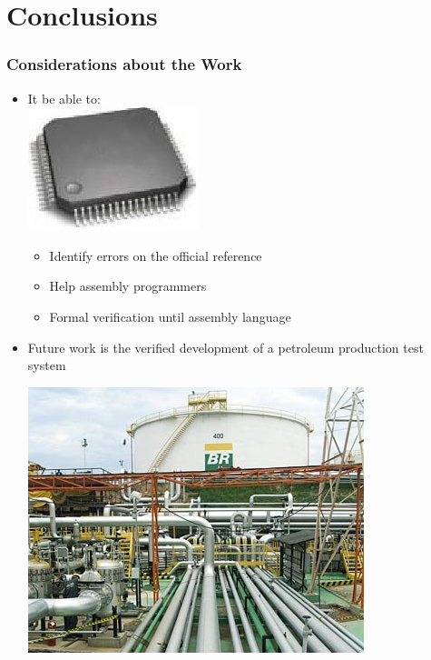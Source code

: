 \section{Conclusions}





 \begin{frame}
 \frametitle{Considerations about the Work}
    
 \begin{itemize}
   \item It be able to: \ \ \ \ \ \ \ \ \ \ \ \ \ \ \ \ \ \ \ \ \ \ \ \ \ \ \ \ \ \ \ 
    \includegraphics[width=.2\textwidth]{figures/processador_generico.jpg}
 	\begin{itemize} 
 	  \item Identify  errors on the official reference
 	  \item Help assembly programmers
 	  \item Formal verification until assembly language 
     \end{itemize} 
     \item Future work is the verified development of a petroleum production test system\\ 
     \begin{center}   
 	   \includegraphics[height=.25\textheight]{figures/dutos.png}
	 \end{center}%
     
 \end{itemize} 
  	
 \end{frame}


